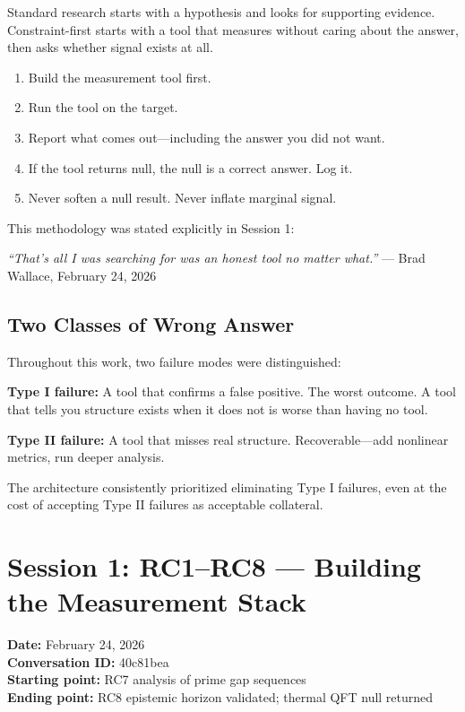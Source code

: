 \documentclass[11pt]{article}
\begin{document}
Standard research starts with a hypothesis and looks for supporting evidence. Constraint-first starts with a tool that measures without caring about the answer, then asks whether signal exists at all.

\begin{enumerate}
  \item Build the measurement tool first.
  \item Run the tool on the target.
  \item Report what comes out---including the answer you did not want.
  \item If the tool returns null, the null is a correct answer. Log it.
  \item Never soften a null result. Never inflate marginal signal.
\end{enumerate}

This methodology was stated explicitly in Session 1:

\begin{graybox}
\textit{``That's all I was searching for was an honest tool no matter what.''} --- Brad Wallace, February 24, 2026
\end{graybox}

\subsection{Two Classes of Wrong Answer}

Throughout this work, two failure modes were distinguished:

\textbf{Type I failure:} A tool that confirms a false positive. The worst outcome. A tool that tells you structure exists when it does not is worse than having no tool.

\textbf{Type II failure:} A tool that misses real structure. Recoverable---add nonlinear metrics, run deeper analysis.

The architecture consistently prioritized eliminating Type I failures, even at the cost of accepting Type II failures as acceptable collateral.

\section{Session 1: RC1--RC8 --- Building the Measurement Stack}
\label{sec:session1}

\textbf{Date:} February 24, 2026\\
\textbf{Conversation ID:} 40c81bea\\
\textbf{Starting point:} RC7 analysis of prime gap sequences\\
\textbf{Ending point:} RC8 epistemic horizon validated; thermal QFT null returned
\end{document}
